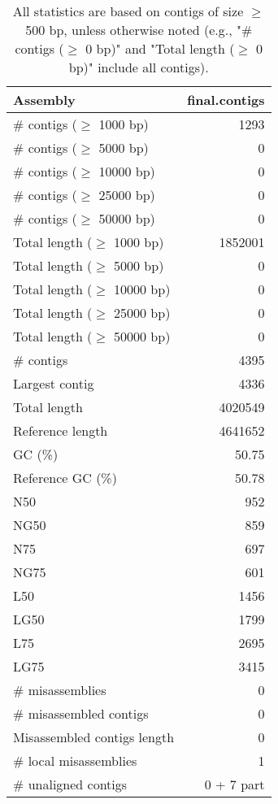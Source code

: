 \documentclass[12pt,a4paper]{article}
\begin{document}
\begin{table}[ht]
\begin{center}
\caption{All statistics are based on contigs of size $\geq$ 500 bp, unless otherwise noted (e.g., "\# contigs ($\geq$ 0 bp)" and "Total length ($\geq$ 0 bp)" include all contigs).}
\begin{tabular}{|l*{1}{|r}|}
\hline
Assembly & final.contigs \\ \hline
\# contigs ($\geq$ 1000 bp) & 1293 \\ \hline
\# contigs ($\geq$ 5000 bp) & 0 \\ \hline
\# contigs ($\geq$ 10000 bp) & 0 \\ \hline
\# contigs ($\geq$ 25000 bp) & 0 \\ \hline
\# contigs ($\geq$ 50000 bp) & 0 \\ \hline
Total length ($\geq$ 1000 bp) & 1852001 \\ \hline
Total length ($\geq$ 5000 bp) & 0 \\ \hline
Total length ($\geq$ 10000 bp) & 0 \\ \hline
Total length ($\geq$ 25000 bp) & 0 \\ \hline
Total length ($\geq$ 50000 bp) & 0 \\ \hline
\# contigs & 4395 \\ \hline
Largest contig & 4336 \\ \hline
Total length & 4020549 \\ \hline
Reference length & 4641652 \\ \hline
GC (\%) & 50.75 \\ \hline
Reference GC (\%) & 50.78 \\ \hline
N50 & 952 \\ \hline
NG50 & 859 \\ \hline
N75 & 697 \\ \hline
NG75 & 601 \\ \hline
L50 & 1456 \\ \hline
LG50 & 1799 \\ \hline
L75 & 2695 \\ \hline
LG75 & 3415 \\ \hline
\# misassemblies & 0 \\ \hline
\# misassembled contigs & 0 \\ \hline
Misassembled contigs length & 0 \\ \hline
\# local misassemblies & 1 \\ \hline
\# unaligned contigs & 0 + 7 part \\ \hline

\end{tabular}
\end{center}
\end{table}
\end{document}
